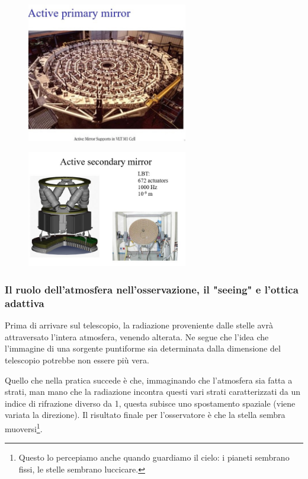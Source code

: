 

\begin{minipage}{0.5\textwidth}
    \begin{figure}[H]
        \centering
        \includegraphics[width=7cm]{17.jpg}
\end{figure}
\end{minipage}
\begin{minipage}{0.5\textwidth}
    \begin{figure}[H]
        \centering
        \includegraphics[width=7cm]{18.jpg}
    \end{figure}
\end{minipage}

\subsubsection{Il ruolo dell'atmosfera nell'osservazione, il "seeing" e l'ottica adattiva}
Prima di arrivare sul telescopio, la radiazione proveniente dalle stelle avrà attraversato l'intera atmosfera, venendo alterata. Ne segue che l'idea che l'immagine di una sorgente puntiforme sia determinata dalla dimensione del telescopio potrebbe non essere più vera.

Quello che nella pratica succede è che, immaginando che l'atmosfera sia fatta a strati, man mano che la radiazione incontra questi vari strati caratterizzati da un indice di rifrazione diverso da 1, questa subisce uno spostamento spaziale (viene variata la direzione). Il risultato finale per l'osservatore è che la stella sembra muoversi\footnote{Questo lo percepiamo anche quando guardiamo il cielo: i pianeti sembrano fissi, le stelle sembrano luccicare.}.

